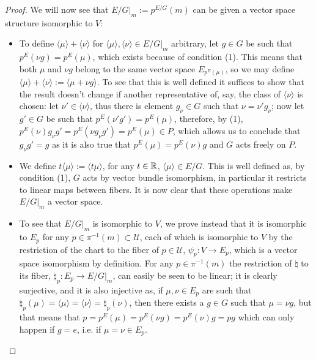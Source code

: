 \begin{proof}
We will now see that $E/G|_m := p^{E/G}(m)$ can be given a vector space structure isomorphic to $V$:
\begin{itemize}
    \item To define $\langle \mu \rangle + \langle \nu \rangle$ for $\langle \mu \rangle, \langle \nu \rangle \in E/G|_m$ arbitrary, let $g \in G$ be such that $p^E(\nu g) = p^E(\mu)$, which exists because of condition (1). This means that both $\mu$ and $\nu g$ belong to the same vector space $E_{p^E(\mu)}$, so we may define $\langle \mu \rangle + \langle \nu \rangle := \langle \mu + \nu g \rangle$. To see that this is well defined it suffices to show that the result doesn't change if another representative of, say, the class of $\langle \nu \rangle$ is chosen: let $\nu' \in \langle \nu \rangle$, thus there is element $g_\nu \in G$ such that $\nu = \nu' g_\nu$; now let $g' \in G$ be such that $p^E(\nu' g') = p^E(\mu)$, therefore, by (1), $p^E(\nu) g_\nu g' = p^E(\nu g_\nu g') = p^E(\mu) \in P$, which allows us to conclude that $g_\nu g' = g$ as it is also true that $p^E(\mu) = p^E(\nu)g$ and $G$ acts freely on $P$.
    
    \item We define $t\langle\mu\rangle := \langle t \mu\rangle$, for any $t \in \mathbb{R}$, $\langle\mu\rangle \in E/G$. This is well defined as, by condition (1), $G$ acts by vector bundle isomorphism, in particular it restricts to linear maps between fibers. It is now clear that these operations make $E/G|_m$ a vector space.
    
    \item To see that $E/G|_m$ is isomorphic to $V$, we prove instead that it is isomorphic to $E_p$ for any $p \in \pi^{-1}(m) \subset \mathcal U$, each of which is isomorphic to $V$ by the restriction of the chart to the fiber of $p \in \mathcal U$, $\psi_p: V \to E_p$, which is a vector space isomorphism by definition. For any $p \in \pi^{-1}(m)$ the restriction of $\natural$ to its fiber, $\natural_p:E_p \to E/G|_m$, can easily be seen to be linear; it is clearly surjective, and it is also injective as, if $\mu, \nu \in E_p$ are such that $\natural_p(\mu) = \langle\mu\rangle = \langle\nu\rangle = \natural_p(\nu)$, then there exists a $g \in G$ such that $\mu = \nu g$, but that means that $p = p^E(\mu) = p^E(\nu g) = p^E(\nu)g = pg$ which can only happen if $g = e$, i.e. if $\mu = \nu \in E_p$.
\end{itemize}


\end{proof}
